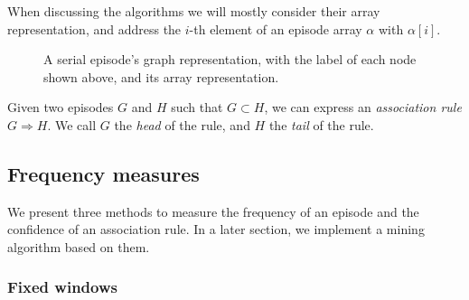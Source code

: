 When discussing the algorithms we will mostly consider their array representation, and address the $ i $-th element of an episode array $ \alpha $ with $ \alpha [i] $.

\begin{figure}
\centering


\caption{A serial episode's graph representation, with the label of each node shown above, and its array representation.}
\label{fig:serial-representation}
\end{figure}

\begin{definition}
Given two episodes $ G $ and $ H $ such that $ G \subset H $, we can express an \emph{association rule} $ G \Rightarrow H $. We call $ G $ the \emph{head} of the rule, and $ H $ the \emph{tail} of the rule.
\end{definition}

\subsection{Frequency measures}

We present three methods to measure the frequency of an episode and the confidence of an association rule. In a later section, we implement a mining algorithm based on them.

\subsubsection{Fixed windows}

